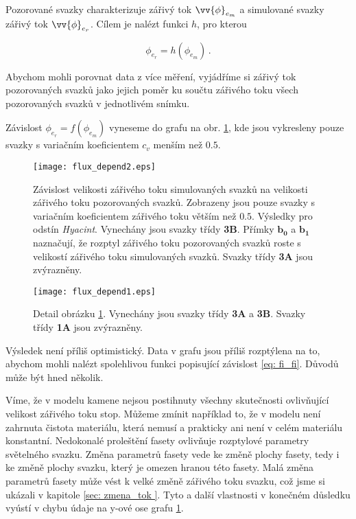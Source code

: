 	Pozorované svazky charakterizuje zářivý tok $\vv{\phi}_{e_m}$ a simulované svazky zářivý tok $\vv{\phi}_{e_r}$. Cílem je nalézt funkci $h$, pro kterou
	
	\begin{equation}	
		\phi_{e_r} = h \left( \phi_{e_m} \right) \,.
		\label{eq: fi_fi}
	\end{equation}

Abychom mohli porovnat data z více měření, vyjádříme si zářivý tok pozorovaných svazků jako jejich poměr ku součtu zářivého toku všech pozorovaných svazků v jednotlivém snímku. 

Závislost $\phi_{e_r} =  f\left( \phi_{e_m} \right)$ vyneseme do grafu na obr. \ref{fig: flux_depend2}, kde jsou vykresleny pouze svazky s variačním koeficientem $c_v$ menším než $0.5$.

\begin{figure}[htps]
\centering
\texttt{[image: flux\_depend2.eps]}
\caption[Závislost zářivého toku simulovaných a pozorovaných svazků.]{Závislost velikosti zářivého toku simulovaných svazků na velikosti zářivého toku pozorovaných svazků. Zobrazeny jsou pouze svazky s variačním koeficientem zářivého toku větším než $0.5$. Výsledky pro odstín \textit{Hyacint}. Vynechány jsou svazky třídy \textbf{3B}. Přímky $\mathbf{b_0}$ a $\mathbf{b_1}$ naznačují, že rozptyl zářivého toku pozorovaných svazků roste s velikostí zářivého toku simulovaných svazků. Svazky třídy \textbf{3A} jsou zvýrazněny.}
\label{fig: flux_depend2}
\end{figure}

\begin{figure}[htps]
\centering
\texttt{[image: flux\_depend1.eps]}
\caption[Závislost zářivého toku simulovaných a pozorovaných svazků - detail.]{Detail obrázku \ref{fig: flux_depend2}. Vynechány jsou svazky třídy \textbf{3A} a \textbf{3B}. Svazky třídy \textbf{1A} jsou zvýrazněny.}
\label{fig: flux_depend1}
\end{figure}

  Výsledek není příliš optimistický. Data v grafu jsou příliš rozptýlena na to, abychom mohli nalézt spolehlivou funkci popisující závislost \ref{eq: fi_fi}. Důvodů může být hned několik. 

Víme, že v modelu kamene nejsou postihnuty všechny skutečnosti ovlivňující velikost zářivého toku stop. Můžeme zmínit například to, že v modelu není zahrnuta čistota materiálu, která nemusí a prakticky ani není v celém materiálu konstantní. Nedokonalé proleštění fasety ovlivňuje rozptylové parametry světelného svazku. Změna parametrů fasety vede ke změně plochy fasety, tedy i ke změně plochy svazku, který je omezen hranou této fasety. Malá změna parametrů fasety může vést k velké změně zářivého toku svazku, což jsme si ukázali v kapitole \ref{sec: zmena_tok }. Tyto a další vlastnosti v konečném důsledku vyústí v chybu údaje na y-ové ose grafu \ref{fig: flux_depend2}.

